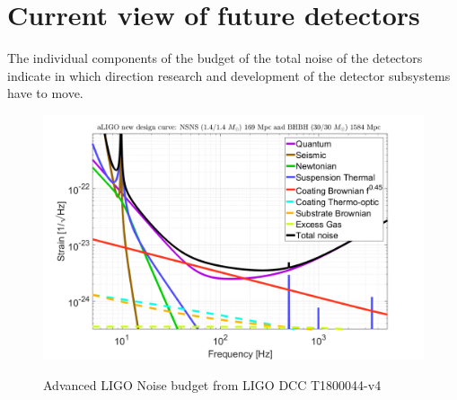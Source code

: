 \section{Current view of future detectors}

The individual components of the budget of the total noise of the detectors indicate in which direction research and development of the detector subsystems have to move.

\begin{figure}[h]
\includegraphics[width=\textwidth]{Figures/aLIGO_newDesign.png}
\label{fig:ALIGOSensitivity}
\caption{Advanced LIGO Noise budget from LIGO DCC T1800044-v4}
\end{figure}



